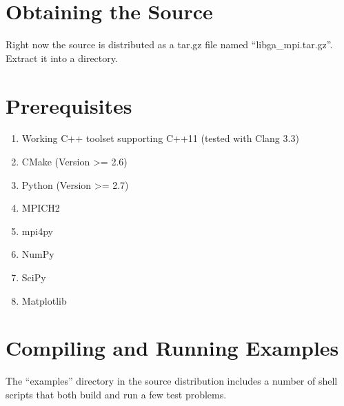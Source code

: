 \documentclass[12pt]{article}
\begin{document}
\section{Obtaining the Source}
Right now the source is distributed as a tar.gz file named ``libga\_mpi.tar.gz''. Extract it into a directory. 

\section{Prerequisites}
\begin{enumerate}
  \item Working C++ toolset supporting C++11 (tested with Clang 3.3)
  \item CMake (Version >= 2.6)
  \item Python (Version >= 2.7)
  \item MPICH2 
  \item mpi4py
  \item NumPy
  \item SciPy
  \item Matplotlib
\end{enumerate}

\section{Compiling and Running Examples}
The ``examples'' directory in the source distribution includes a number of shell scripts that both build and run a few test problems. 
\end{document}
